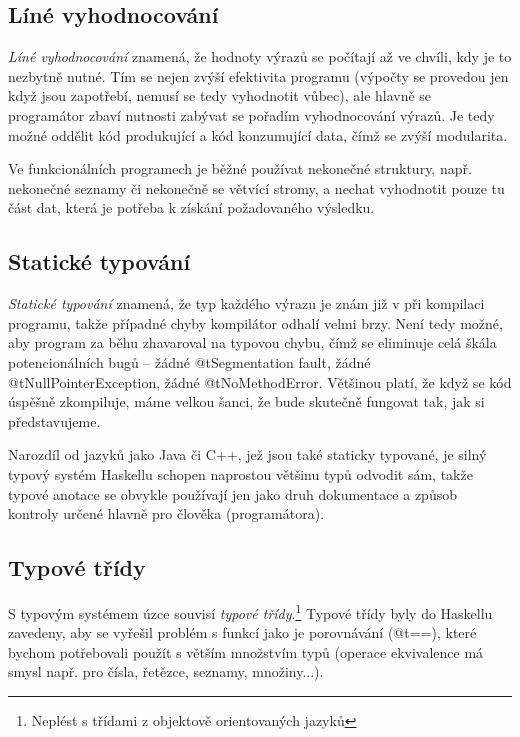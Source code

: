 
\subsection{Líné vyhodnocování}

\emph{Líné vyhodnocování} znamená, že hodnoty výrazů se počítají až ve chvíli,
kdy je to nezbytně nutné. Tím se nejen zvýší efektivita programu (výpočty se
provedou jen když jsou zapotřebí, nemusí se tedy vyhodnotit vůbec), ale hlavně
se programátor zbaví nutnosti zabývat se pořadím vyhodnocování výrazů. Je tedy možné
oddělit kód produkující a kód konzumující data, čímž se zvýší modularita. 


Ve funkcionálních programech je běžné používat nekonečné struktury, např.
nekonečné seznamy či nekonečně se větvící stromy, a nechat vyhodnotit pouze tu
část dat, která je potřeba k získání požadovaného výsledku.

\subsection{Statické typování}

\emph{Statické typování} znamená, že typ každého výrazu je znám již v při
kompilaci programu, takže případné chyby kompilátor odhalí velmi brzy. Není tedy
možné, aby program za běhu zhavaroval na typovou chybu, čímž se eliminuje celá
škála potencionálních bugů -- žádné @t{Segmentation fault}, žádné
@t{NullPointerException}, žádné @t{NoMethodError}. Většinou platí, že když se
kód úspěšně zkompiluje, máme velkou šanci, že bude skutečně fungovat tak, jak si
představujeme.

Narozdíl od jazyků jako Java či C++, jež jsou také staticky typované, je silný
typový systém Haskellu schopen naprostou většinu typů odvodit sám, takže typové
anotace se obvykle používají jen jako druh dokumentace a způsob kontroly určené
hlavně pro člověka (programátora).

\subsection{Typové třídy}

S typovým systémem úzce souvisí \emph{typové třídy}.\footnote{Neplést s třídami
z objektově orientovaných jazyků} Typové třídy byly do Haskellu zavedeny, aby se
vyřešil problém s  funkcí jako je porovnávání (@t{==}), které
bychom potřebovali použít s větším množstvím typů (operace ekvivalence má smysl
např. pro čísla, řetězce, seznamy, množiny...).

